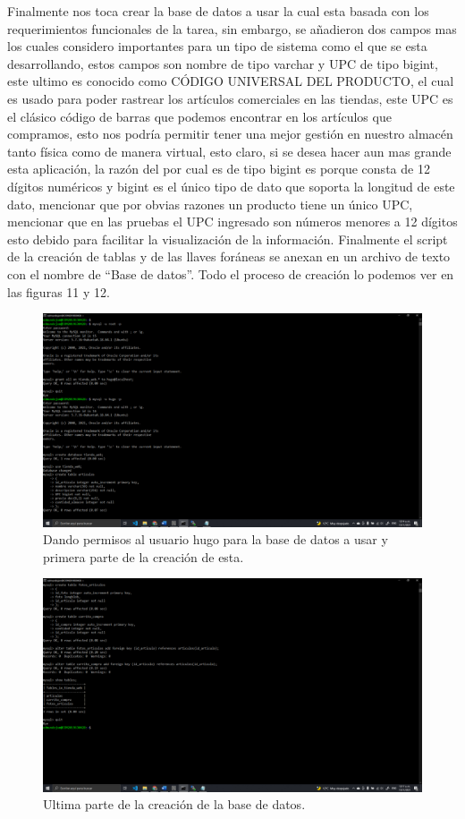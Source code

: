 \documentclass[11pt]{article}
\begin{document}
		Finalmente nos toca crear la base de datos a usar la cual esta basada con los requerimientos funcionales de la tarea, sin embargo, se añadieron dos campos mas los cuales considero importantes para un tipo de sistema como el que se esta desarrollando, estos campos son nombre de tipo varchar y UPC de tipo bigint, este ultimo es conocido como CÓDIGO UNIVERSAL DEL PRODUCTO, el cual es usado para poder rastrear los artículos comerciales en las tiendas, este UPC es el clásico código de barras que podemos encontrar en los artículos que compramos, esto nos podría permitir tener una mejor gestión en nuestro almacén tanto física como de manera virtual, esto claro, si se desea hacer aun mas grande esta aplicación, la razón del por cual es de tipo bigint es porque consta de 12 dígitos numéricos y bigint es el único tipo de dato que soporta la longitud de este dato, mencionar que por obvias razones un producto tiene un único UPC, mencionar que en las pruebas el UPC ingresado son números menores a 12 dígitos esto debido para facilitar la visualización de la información. Finalmente el script de la creación de tablas y de las llaves foráneas se anexan en un archivo de texto con el nombre de ``Base de datos''. Todo el proceso de creación lo podemos ver en las figuras 11 y 12.
		\begin{figure}[H]
			\centering
			\includegraphics[scale=0.34]{resources/mysql1.png}
			\caption{Dando permisos al usuario hugo para la base de datos a usar y primera parte de la creación de esta.}\label{fig:picture}
		\end{figure}
		\begin{figure}[H]
			\centering
			\includegraphics[scale=0.34]{resources/mysql2.png}
			\caption{Ultima parte de la creación de la base de datos.}\label{fig:picture}
		\end{figure}
\end{document}

